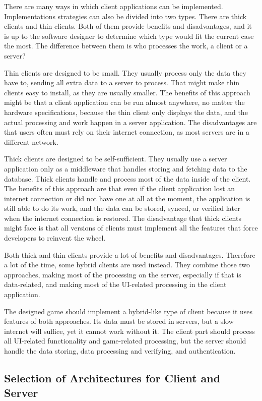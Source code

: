 There are many ways in which client applications can be implemented.
Implementations strategies can also be divided into two types.
There are thick clients and thin clients.
Both of them provide benefits and disadvantages, and it is up to the software designer to determine which type would fit the current case the most.
The difference between them is who processes the work, a client or a server?

Thin clients are designed to be small.
They usually process only the data they have to, sending all extra data to a server to process.
That might make thin clients easy to install, as they are usually smaller.
The benefits of this approach might be that a client application can be run almost anywhere, no matter the hardware specifications, because the thin client only displays the data, and the actual processing and work happen in a server application.
The disadvantages are that users often must rely on their internet connection, as most servers are in a different network.

Thick clients are designed to be self-sufficient.
They usually use a server application only as a middleware that handles storing and fetching data to the database.  
Thick clients handle and process most of the data inside of the client.
The benefits of this approach are that even if the client application lost an internet connection or did not have one at all at the moment, the application is still able to do its work, and the data can be stored, synced, or verified later when the internet connection is restored.
The disadvantage that thick clients might face is that all versions of clients must implement all the features that force developers to reinvent the wheel.

Both thick and thin clients provide a lot of benefits and disadvantages.
Therefore a lot of the time, some hybrid clients are used instead.
They combine those two approaches, making most of the processing on the server, especially if that is data-related, and making most of the UI-related processing in the client application.

The designed game should implement a hybrid-like type of client because it uses features of both approaches.
Its data must be stored in servers, but a slow internet will suffice, yet it cannot work without it.
The client part should process all UI-related functionality and game-related processing, but the server should handle the data storing, data processing and verifying, and authentication.

\subsection{Selection of Architectures for Client and Server}

